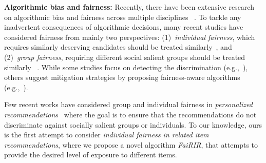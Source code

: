 \vspace{2mm}
\noindent \textbf{Algorithmic bias and fairness:} 
Recently, there have been extensive research on algorithmic bias and fairness across multiple disciplines %
~\cite{barocas2016big}. %
To %
tackle any inadvertent consequences of algorithmic decisions,
many recent studies have considered fairness from mainly two perspectives: 
(1)~{\it individual fairness}, which requires similarly deserving candidates should be treated similarly~\cite{zemel2013learning,lahoti2019ifair}, and 
(2)~{\it group fairness}, requiring different social salient groups should %
be treated similarly %
~\cite{pedreshi2008discrimination, pedreschi2009measuring}. 
While some studies focus on detecting
the discrimination (e.g.,~\cite{angwin2016machine,pedreshi2008discrimination}),
others suggest 
mitigation strategies by proposing fairness-aware
algorithms (e.g.,~\cite{lahoti2019ifair,zafar2017fairness,zehlike2017fa}).

Few recent works have considered group and individual fairness in {\it personalized recommendations}~\cite{yao2017beyond,edizel2019fairecsys,geyik2019fairness, patro2020incremental, patro2020fairrec} where the goal is to ensure 
that the recommendations do not discriminate against socially salient groups or individuals. 
To our knowledge, ours is the first attempt to consider {\it individual fairness in related item recommendations}, where we %
propose a novel algorithm {\it FaiRIR}, that attempts to provide the desired level of exposure to different items. 
